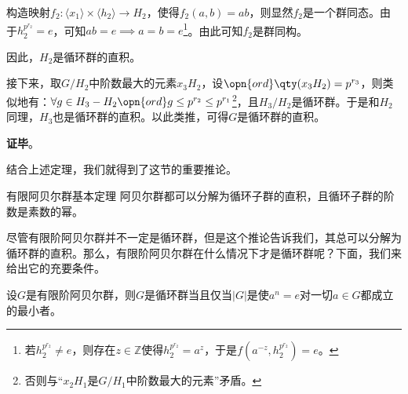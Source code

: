 构造映射$f_2:\langle x_1 \rangle\times \langle h_2 \rangle\to H_2$，使得$f_2(a, b)=ab$，则显然$f_2$是一个群同态。由于$h_2^{p^{r_2}}=e$，可知$ab=e\implies a=b=e$\footnote{若$h_2^{p^{r_2}}\not=e$，则存在$z\in\mathbb{Z}$使得$h_2^{p^{r_2}}=a^z$，于是$f(a^{-z}, h_2^{p^{r_2}})=e$。}。由此可知$f_2$是群同构。

因此，$H_2$是循环群的直积。

接下来，取$G/H_2$中阶数最大的元素$x_3H_2$，设$\opn{ord}\qty(x_3H_2)=p^{r_3}$，则类似地有：$\forall g\in H_3-H_2 \opn{ord}g\leq p^{r_2}\leq p^{r_1}$\footnote{否则与“$x_2H_1$是$G/H_1$中阶数最大的元素”矛盾。}，且$H_3/H_2$是循环群。于是和$H_2$同理，$H_3$也是循环群的直积。以此类推，可得$G$是循环群的直积。

\textbf{证毕}。















结合上述定理，我们就得到了这节的重要推论。

\begin{corollary}{有限阿贝尔群基本定理}
阿贝尔群都可以分解为循环子群的直积，且循环子群的阶数是素数的幂。
\end{corollary}
尽管有限阶阿贝尔群并不一定是循环群，但是这个推论告诉我们，其总可以分解为循环群的直积。那么，有限阶阿贝尔群在什么情况下才是循环群呢？下面，我们来给出它的充要条件。
\begin{theorem}{}\label{the_cyclic_5}
设$G$是有限阶阿贝尔群，则$G$是循环群当且仅当$|G|$是使$a^n=e$对一切$a\in G$都成立的最小者。
\end{theorem}

